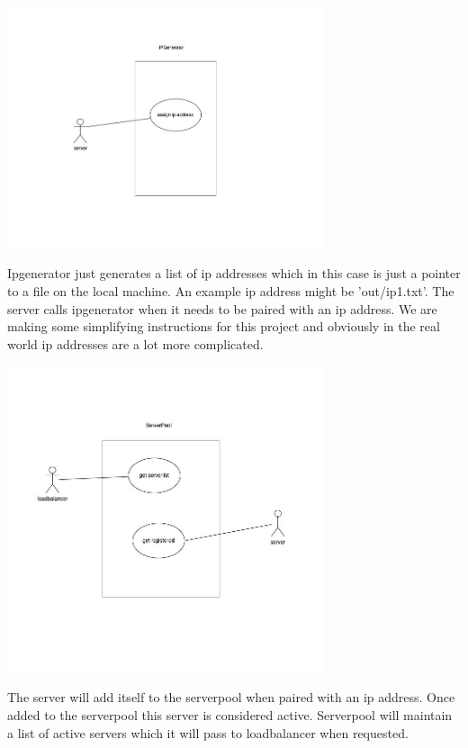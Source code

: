 \documentclass{article}
\begin{document}
\includegraphics[width=0.7\textwidth,center]{Ipgenerator_usecase.jpeg}

Ipgenerator just generates a list of ip addresses which in this case is just a pointer to a file on the local machine. An example ip address might be 'out/ip1.txt'. The server calls ipgenerator when it needs to be paired with an ip address. We are making some simplifying instructions for this project and obviously in the real world ip addresses are a lot more complicated. 

\includegraphics[width=0.7\textwidth,center]{Serverpool_usecase.jpeg}

The server will add itself to the serverpool when paired with an ip address. Once added to the serverpool this server is considered active. Serverpool will maintain a list of active servers which it will pass to loadbalancer when requested. 
\end{document}
